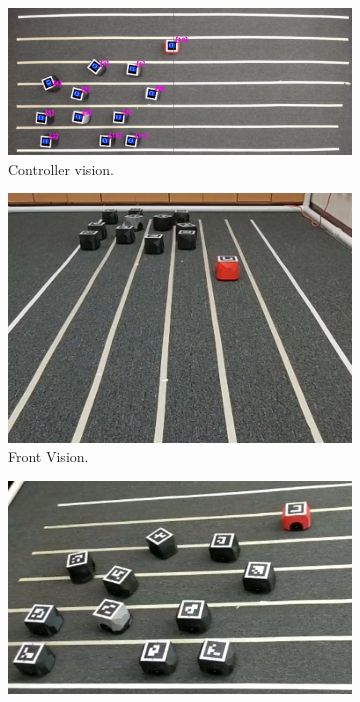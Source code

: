 \begin{appendix}
\begin{figure}[H]
\centering
\begin{subfigure}[t]{\textwidth}
    \includegraphics[width=\textwidth]{Anexos/no_restricted/no_res_it10_cam0.png}
    \caption{Controller vision.}
    \label{fig:first}
\end{subfigure}
\vspace{1cm}
\begin{subfigure}[b]{0.4\textwidth}
    \includegraphics[width=\textwidth]{Anexos/no_restricted/no_res_it10_cam1.png}
    \caption{Front Vision.}
    \label{fig:second}
\end{subfigure}
\hfill
\begin{subfigure}[b]{0.50\textwidth}
    \includegraphics[width=\textwidth]{Anexos/no_restricted/no_res_it10_cam2.png}

\end{subfigure}
\end{figure}
\end{appendix}
